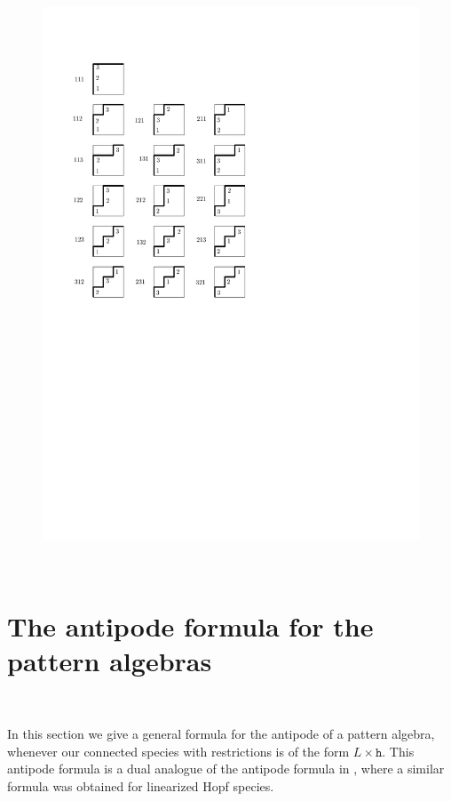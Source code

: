 \documentclass[12pt, reqno]{amsart}
\theoremstyle{definition}
\begin{document}
\begin{figure}
\centering
\includegraphics[scale=1]{images/parking_functions_3}
\caption{\label{fig:PF3}}
\end{figure}





\

\section{The antipode formula for the pattern algebras \label{sec:formula_general}}
\

In this section we give a general formula for the antipode of a pattern algebra, whenever our connected species with restrictions is of the form $L \times \mathtt{h}$. This antipode formula is a dual analogue of the antipode formula in \cite{BergeronBenedetti}, where a similar formula was obtained for linearized Hopf species.
\end{document}
